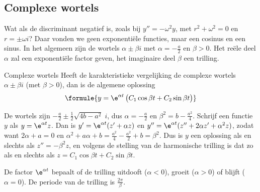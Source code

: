 \subsection{Complexe wortels}

Wat als de discriminant negatief is, zoals bij $y'' = -\omega^2 y$, met $r^2 + \omega^2 = 0$ en $r = \pm\omega i$? Daar vonden we geen exponentiële functies, maar een cosinus en een sinus. In het algemeen zijn de wortels $\alpha \pm \beta i$ met $\alpha = -\tfrac a2$ en $\beta > 0$. Het reële deel $\alpha$ zal een exponentiële factor geven, het imaginaire deel $\beta$ een trilling.

\begin{theorie}
\begin{stelling}{Complexe wortels}
Heeft de karakteristieke vergelijking de complexe wortels $\alpha \pm \beta i$ (met $\beta > 0$), dan is de algemene oplossing
\[
\formule{y = \e^{\alpha t}\,\bigl(C_1 \cos \beta t + C_2 \sin \beta t\bigr)}
\]
\end{stelling}

\begin{bewijs}
De wortels zijn $-\tfrac a2 \pm \tfrac12\sqrt{4b - a^2}\;i$, dus $\alpha = -\tfrac a2$ en $\beta^2 = b - \tfrac{a^2}{4}$. Schrijf een functie $y$ als $y = \e^{\alpha t} z$. Dan is $y' = \e^{\alpha t}(z' + \alpha z)$ en $y'' = \e^{\alpha t}(z'' + 2\alpha z' + \alpha^2 z)$, zodat
want $2\alpha + a = 0$ en $\alpha^2 + a\alpha + b = \tfrac{a^2}{4} - \tfrac{a^2}{2} + b = \beta^2$. Dus is $y$ een oplossing als en slechts als $z'' = -\beta^2 z$, en volgens de stelling van de harmonische trilling is dat zo als en slechts als $z = C_1\cos\beta t + C_2\sin\beta t$.
\end{bewijs}
\end{theorie}

De factor $\e^{\alpha t}$ bepaalt of de trilling uitdooft ($\alpha < 0$), groeit ($\alpha > 0$) of blijft ($\alpha = 0$). De periode van de trilling is $\tfrac{2\pi}{\beta}$.

